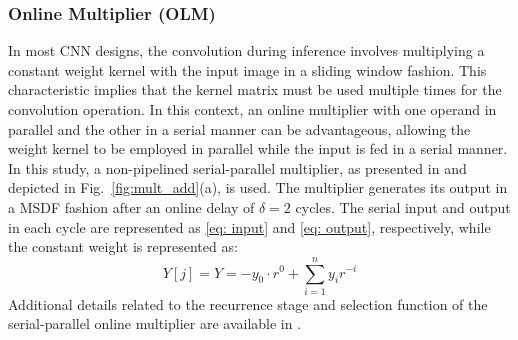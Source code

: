 \documentclass[conference]{IEEEtran}
\begin{document}
\subsubsection{Online Multiplier (OLM)} \label{sec: Online_mult}
In most CNN designs, the convolution during inference involves multiplying a constant weight kernel with the input image in a sliding window fashion. This characteristic implies that the kernel matrix must be used multiple times for the convolution operation. In this context, an online multiplier with one operand in parallel and the other in a serial manner can be advantageous, allowing the weight kernel to be employed in parallel while the input is fed in a serial manner. In this study, a non-pipelined serial-parallel multiplier, as presented in \cite{usman2023low} and depicted in Fig.~\ref{fig:mult_add}(a), is used. The multiplier generates its output in a MSDF fashion after an online delay of $\delta = 2$ cycles. The serial input and output in each cycle are represented as \eqref{eq: input} and \eqref{eq: output}, respectively, while the constant weight is represented as:
\begin{equation}
    Y[j] = Y = -y_0 \cdot r^0 + \sum_{i=1}^{n} y_ir^{-i}
 \end{equation}
Additional details related to the recurrence stage and selection function of the serial-parallel online multiplier are available in \cite{usman2023low}.
\end{document}
